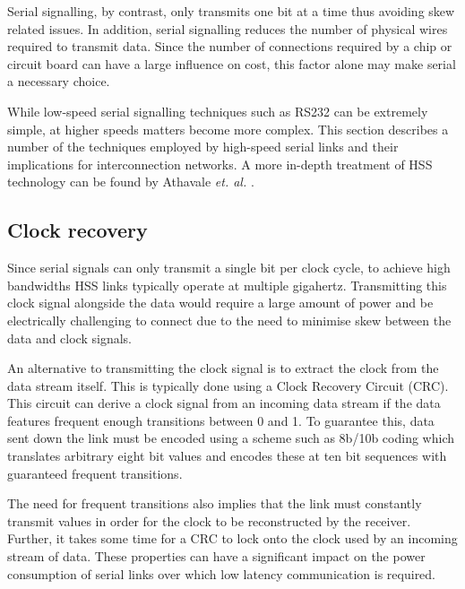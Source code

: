 		Serial signalling, by contrast, only transmits one bit at a time thus
		avoiding skew related issues. In addition, serial signalling reduces the
		number of physical wires required to transmit data. Since the number of
		connections required by a chip or circuit board can have a large influence
		on cost, this factor alone may make serial a necessary choice.
		
		While low-speed serial signalling techniques such as RS232 can be extremely
		simple, at higher speeds matters become more complex. This section describes
		a number of the techniques employed by high-speed serial links and their
		implications for interconnection networks. A more in-depth treatment of HSS
		technology can be found by Athavale \emph{et. al.} \cite{athavale05}.
		
		\subsection{Clock recovery}
			
			
			Since serial signals can only transmit a single bit per clock cycle, to
			achieve high bandwidths HSS links typically operate at multiple gigahertz.
			Transmitting this clock signal alongside the data would require a large
			amount of power and be electrically challenging to connect due to the need
			to minimise skew between the data and clock signals.
			
			An alternative to transmitting the clock signal is to extract the clock
			from the data stream itself. This is typically done using a Clock Recovery
			Circuit (CRC). This circuit can derive a clock signal from an incoming
			data stream if the data features frequent enough transitions between 0 and
			1. To guarantee this, data sent down the link must be encoded using a
			scheme such as 8b/10b coding \cite{widmer83} which translates arbitrary
			eight bit values and encodes these at ten bit sequences with guaranteed
			frequent transitions.
			
			The need for frequent transitions also implies that the link must
			constantly transmit values in order for the clock to be reconstructed by
			the receiver. Further, it takes some time for a CRC to lock onto the clock
			used by an incoming stream of data. These properties can have a
			significant impact on the power consumption of serial links over which low
			latency communication is required.
		
